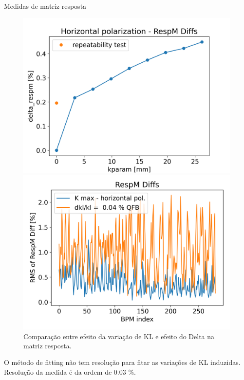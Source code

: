 \documentclass[1610]{beamer}					  %
\begin{document}
\begin{frame}{Medidas de matriz resposta}
  \begin{figure}[ht]
        \begin{minipage}[b]{0.45\linewidth}
            \centering
            \includegraphics[width=\textwidth]{2024-04-19/figures/repeatability.png}
            \caption{Comparação do efeito do Delta na matriz resposta com repetibilidade da medida.}
            \label{fig:a}
        \end{minipage}
        \hspace{0.5cm}
        \begin{minipage}[b]{0.45\linewidth}
            \centering
            \includegraphics[width=\textwidth]{2024-04-19/figures/Matrix_diff.png}
            \caption{Comparação entre efeito da variação de KL e efeito do Delta na matriz resposta.}
            \label{fig:b}
        \end{minipage}
   \end{figure}
O método de fitting não tem resolução para fitar as variações de KL induzidas. Resolução da medida é da ordem de 0.03 \%.
\end{frame}
\end{document}
